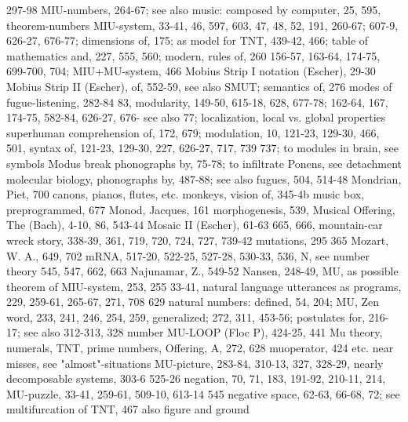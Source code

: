 297-98 MIU-numbers, 264-67; see also          music: composed by computer, 25, 595,
theorem-numbers MIU-system, 33-41, 46,        597, 603,
47, 48, 52, 191, 260-67;                      607-9, 626-27, 676-77; dimensions of, 175;
as model for TNT, 439-42, 466; table of       mathematics and, 227, 555, 560; modern,
rules of, 260                                 156-57, 163-64, 174-75, 699-700, 704;
MIU+MU-system, 466 Mobius Strip I             notation
(Escher), 29-30 Mobius Strip II (Escher),     of, 552-59, see also SMUT; semantics of,
276 modes of fugue-listening, 282-84          83,
modularity, 149-50, 615-18, 628, 677-78;      162-64, 167, 174-75, 582-84, 626-27, 676-
see also                                      77;
localization, local vs. global properties     superhuman comprehension of, 172, 679;
modulation, 10, 121-23, 129-30, 466, 501,     syntax of, 121-23, 129-30, 227, 626-27,
717, 739                                      737; to
modules in brain, see symbols Modus           break phonographs by, 75-78; to infiltrate
Ponens, see detachment molecular biology,     phonographs by, 487-88; see also fugues,
504, 514-48 Mondrian, Piet, 700               canons, pianos, flutes, etc.
monkeys, vision of, 345-4b                    music box, preprogrammed, 677
Monod, Jacques, 161 morphogenesis, 539,       Musical Offering, The (Bach), 4-10, 86,
543-44 Mosaic II (Escher), 61-63              665, 666,
mountain-car wreck story, 338-39, 361,        719, 720, 724, 727, 739-42 mutations, 295
365 Mozart, W. A., 649, 702
mRNA, 517-20, 522-25, 527-28, 530-33,
536,                                          N, see number theory
545, 547, 662, 663                            Najunamar, Z., 549-52 Nansen, 248-49,
MU, as possible theorem of MIU-system,        253, 255
33-41,                                        natural language utterances as programs,
229, 259-61, 265-67, 271, 708                 629 natural numbers: defined, 54, 204;
MU, Zen word, 233, 241, 246, 254, 259,        generalized;
272, 311,                                     453-56; postulates for, 216-17; see also
312-313, 328                                  number
MU-LOOP (Floc P), 424-25, 441 Mu              theory, numerals, TNT, prime numbers,
Offering, A, 272, 628 muoperator, 424         etc. near misses, see "almost"-situations
MU-picture, 283-84, 310-13, 327, 328-29,      nearly decomposable systems, 303-6
525-26                                        negation, 70, 71, 183, 191-92, 210-11, 214,
MU-puzzle, 33-41, 259-61, 509-10, 613-14      545 negative space, 62-63, 66-68, 72; see
multifurcation of TNT, 467                    also figure and ground
